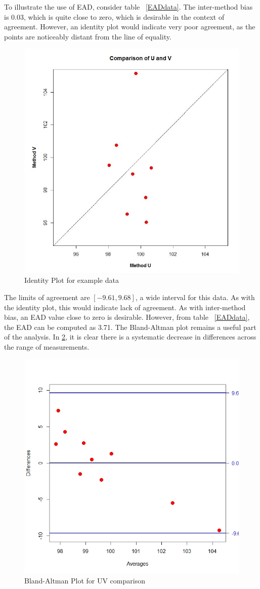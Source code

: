 \documentclass[12pt, a4paper]{report}
\theoremstyle{plain}
\theoremstyle{definition}
\theoremstyle{remark}
\begin{document}
	To illustrate the use of EAD, consider table ~\ref{EADdata}. The inter-method bias is 0.03, which is quite close to zero, which is desirable in the context of agreement. However, an identity plot would indicate very poor agreement, as the points are noticeably distant from the line of equality.
	\begin{figure}
		\centering
		\includegraphics[width=0.7\linewidth]{EAD-UV}
		\caption{Identity Plot for example data}
		\label{fig:EADidentity}
	\end{figure}
	
	The limits of agreement are $[-9.61, 9.68]$, a wide interval for this data. As with the identity plot, this would indicate lack of agreement. As with inter-method bias, an EAD value close to zero is desirable. However, from table ~\ref{EADdata}, the EAD can be computed as 3.71. The Bland-Altman plot remains a useful part of the analysis. In \ref{fig:EAD1}, it is clear there is a systematic decrease in differences across the range of measurements.
	\begin{figure}
		\centering
		\includegraphics[width=0.7\linewidth]{images/EAD1}
		\caption{Bland-Altman Plot for UV comparison}
		\label{fig:EAD1}
	\end{figure}
	
\end{document}
